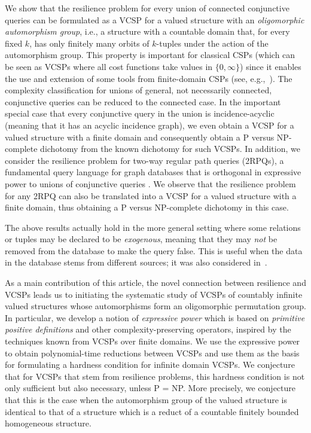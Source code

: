 \documentclass[nonacm]{acmart}
\begin{document}
We show that the resilience problem for every union of connected conjunctive queries
can be formulated as a VCSP for a valued structure with an \emph{oligomorphic automorphism group}, i.e., a structure with a countable domain that, for every fixed $k$, has only finitely many orbits of $k$-tuples under the action of the automorphism group. This property is important for classical CSPs (which can be seen as VCSPs where all cost functions take values in 
$\{0,\infty\}$) since it enables the use
and extension of some tools from finite-domain CSPs (see, e.g.,~\cite{Book}). 
The complexity classification for unions of general, not necessarily connected, conjunctive queries can be reduced to the connected case. 
In the important special case that every conjunctive query in the union is incidence-acyclic (meaning that it has an acyclic incidence graph), we even obtain a VCSP for a valued structure with a finite domain and consequently obtain a P versus NP-complete dichotomy from the known dichotomy for such VCSPs. In addition, we consider the resilience problem for
two-way regular path queries (2RPQs), a fundamental query language for graph databases that 
is orthogonal in expressive power to unions of conjunctive queries \cite{DBLP:journals/sigmod/CalvaneseGLV03,DBLP:conf/icdt/MartensT18}. We observe that the resilience problem for any 2RPQ can also be
translated into a VCSP for a valued structure with a finite domain, thus obtaining a P versus NP-complete dichotomy 
in this case.



The above results actually 
hold in the more general setting where some relations or tuples may be declared to be \emph{exogenous}, meaning that they may \emph{not} be removed from the database to make the query false. This is useful when the data in the database stems from different sources; it was also considered in~\cite{Resilience,NewResilience, LatestResilience}.

As a main contribution of this article, the novel connection between resilience 
and VCSPs leads us to initiating the systematic study of VCSPs of countably infinite valued structures whose automorphisms form an oligomorphic permutation group. In particular, we develop a notion of \emph{expressive power} which is based on \emph{primitive positive definitions} and other complexity-preserving operators, inspired by the techniques known from VCSPs over finite domains. We use the expressive power to obtain polynomial-time reductions between VCSPs and use
them as the basis for formulating  a hardness condition for infinite domain
VCSPs.  We  conjecture that for VCSPs that stem from resilience problems, this hardness condition is not only
sufficient but also necessary, unless P = NP. More
precisely, we conjecture that this is the case when the automorphism group of the valued structure is identical
to that of a structure which is a reduct of a countable finitely
bounded homogeneous structure.
\end{document}
